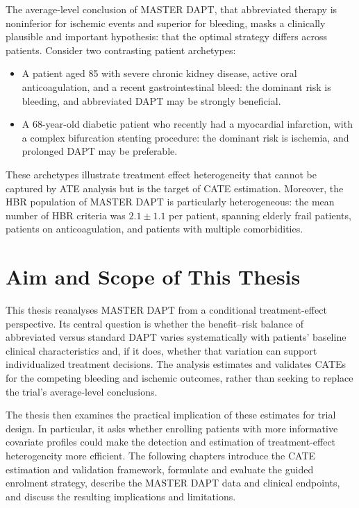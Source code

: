 The average-level conclusion of MASTER DAPT, that abbreviated therapy is
noninferior for ischemic events and superior for bleeding, masks a clinically
plausible and important hypothesis: that the optimal strategy differs across
patients. Consider two contrasting patient archetypes:
\begin{itemize}
  \item A patient aged 85 with severe chronic kidney disease, active oral
    anticoagulation, and a recent gastrointestinal bleed: the dominant risk
    is bleeding, and abbreviated DAPT may be strongly beneficial.
  \item A 68-year-old diabetic patient who recently had a myocardial
    infarction, with a complex bifurcation stenting procedure: the dominant
    risk is ischemia, and prolonged DAPT may be preferable.
\end{itemize}

These archetypes illustrate treatment effect heterogeneity that cannot be
captured by ATE analysis but is the target of CATE estimation. Moreover, the
HBR population of MASTER DAPT is particularly heterogeneous: the mean number
of HBR criteria was $2.1 \pm 1.1$ per patient, spanning elderly frail patients,
patients on anticoagulation, and patients with multiple comorbidities.

\section{Aim and Scope of This Thesis}

This thesis reanalyses MASTER DAPT from a conditional treatment-effect
perspective. Its central question is whether the benefit--risk balance of
abbreviated versus standard DAPT varies systematically with patients' baseline
clinical characteristics and, if it does, whether that variation can support
individualized treatment decisions. The analysis estimates and validates CATEs
for the competing bleeding and ischemic outcomes, rather than seeking to
replace the trial's average-level conclusions.

The thesis then examines the practical implication of these estimates for trial
design. In particular, it asks whether enrolling patients with more informative
covariate profiles could make the detection and estimation of treatment-effect
heterogeneity more efficient. The following chapters introduce the CATE
estimation and validation framework, formulate and evaluate the guided
enrolment strategy, describe the MASTER DAPT data and clinical endpoints, and
discuss the resulting implications and limitations.

